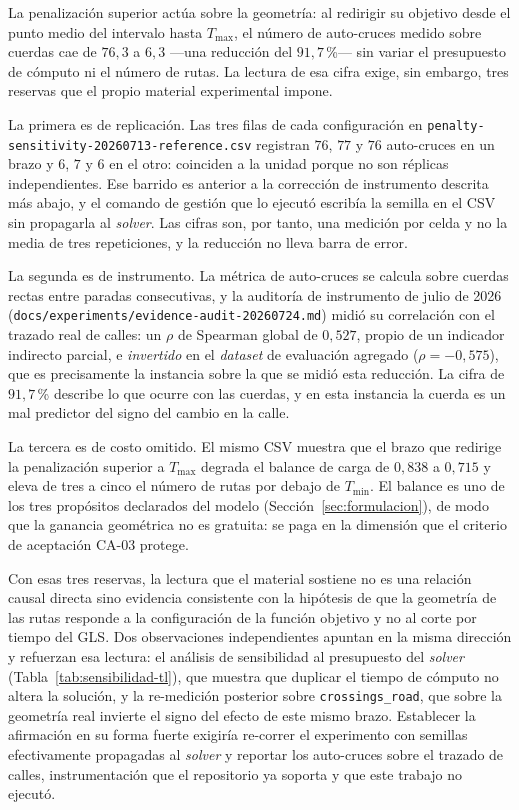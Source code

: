 La penalización superior actúa sobre la geometría: al redirigir su objetivo desde el
punto medio del intervalo hasta $T_{\max}$, el número de auto-cruces medido sobre
cuerdas cae de $76{,}3$ a $6{,}3$ ---una reducción del $91{,}7$\,\%--- sin variar el
presupuesto de cómputo ni el número de rutas. La lectura de esa cifra exige, sin
embargo, tres reservas que el propio material experimental impone.

La primera es de replicación. Las tres filas de cada configuración en
\texttt{penalty-sensitivity-20260713-reference.csv} registran $76$, $77$ y $76$
auto-cruces en un brazo y $6$, $7$ y $6$ en el otro: coinciden a la unidad porque no
son réplicas independientes. Ese barrido es anterior a la corrección de instrumento
descrita más abajo, y el comando de gestión que lo ejecutó escribía la semilla en el
CSV sin propagarla al \textit{solver}. Las cifras son, por tanto, una medición por
celda y no la media de tres repeticiones, y la reducción no lleva barra de error.

La segunda es de instrumento. La métrica de auto-cruces se calcula sobre cuerdas
rectas entre paradas consecutivas, y la auditoría de instrumento de julio de 2026
(\texttt{docs/experiments/evidence-audit-20260724.md}) midió su
correlación con el trazado real de calles: un $\rho$ de Spearman global de $0{,}527$,
propio de un indicador indirecto parcial, e \textit{invertido} en el
\textit{dataset} de evaluación agregado ($\rho = -0{,}575$), que es precisamente la
instancia sobre la que se midió esta reducción. La cifra de $91{,}7$\,\% describe lo
que ocurre con las cuerdas, y en esta instancia la cuerda es un mal predictor del
signo del cambio en la calle.

La tercera es de costo omitido. El mismo CSV muestra que el brazo que redirige la
penalización superior a $T_{\max}$ degrada el balance de carga de $0{,}838$ a
$0{,}715$ y eleva de tres a cinco el número de rutas por debajo de $T_{\min}$. El
balance es uno de los tres propósitos declarados del modelo
(Sección~\ref{sec:formulacion}), de modo que la ganancia geométrica no es gratuita:
se paga en la dimensión que el criterio de aceptación CA-03 protege.

Con esas tres reservas, la lectura que el material sostiene no es una relación causal
directa sino evidencia consistente con la hipótesis de que la geometría de las rutas
responde a la configuración de la función objetivo y no al corte por tiempo del GLS.
Dos observaciones independientes apuntan en la misma dirección y refuerzan esa
lectura: el análisis de sensibilidad al presupuesto del \textit{solver}
(Tabla~\ref{tab:sensibilidad-tl}), que muestra que duplicar el tiempo de cómputo no
altera la solución, y la re-medición posterior sobre \texttt{crossings\_road}, que
sobre la geometría real invierte el signo del efecto de este mismo brazo. Establecer
la afirmación en su forma fuerte exigiría re-correr el experimento con semillas
efectivamente propagadas al \textit{solver} y reportar los auto-cruces sobre el
trazado de calles, instrumentación que el repositorio ya soporta y que este trabajo no
ejecutó.

